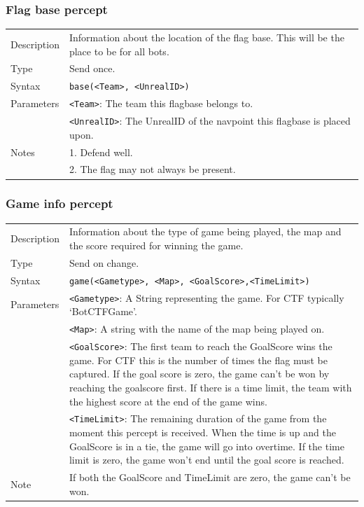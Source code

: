 \documentclass[11pt,a4paper]{article}
\begin{document}
\subsubsection*{Flag base percept}
\begin{small}
\begin{tabular}{p{2cm}p{9cm}}
Description & Information about the location of the flag base. This will be the place to be for all bots.\\
Type & Send once.\\
Syntax & \verb|base(<Team>, <UnrealID>)|\\ 
Parameters &
	\verb|<Team>|: The team this flagbase belongs to.\\
&	\verb|<UnrealID>|: The UnrealID of the navpoint this flagbase is placed upon.\\
Notes & 
	1.	Defend well.\\
&	2.	The flag may not always be present.
\end{tabular}
\end{small}

\subsubsection*{Game info percept}
\begin{small}
\begin{tabular}{p{2cm}p{9cm}}
Description & Information about the type of game being played, the map and the score required for winning the game.\\
Type & Send on change.\\
Syntax & \verb|game(<Gametype>, <Map>, <GoalScore>,<TimeLimit>)|\\
Parameters &
	\verb|<Gametype>|: A String representing the game. For CTF typically `BotCTFGame'.\\
&	\verb|<Map>|: A string with the name of the map being played on. \\
&	\verb|<GoalScore>|: The first team to reach the GoalScore wins the game. For CTF this is the number of times the flag must be captured.  If the goal score is zero, the game can't be won by reaching the goalscore first. If there is a time limit, the team with the highest score at the end of the game wins.\\
&	\verb|<TimeLimit>|: The remaining duration of the game from the moment this percept is received. When the time is up and the GoalScore is in a tie, the game will go into overtime. If the time limit is zero, the game won't end until the goal score is reached.\\
Note & If both the GoalScore and TimeLimit are zero, the game can't be won.
\end{tabular}
\end{small}
\end{document}
